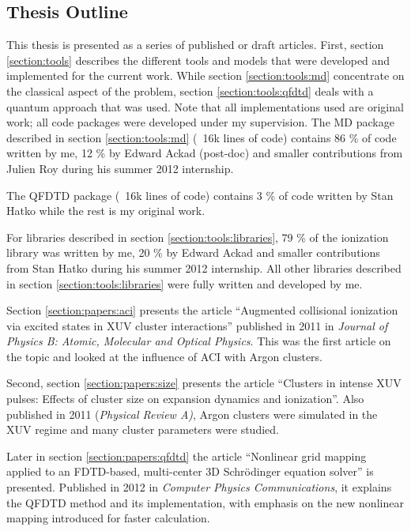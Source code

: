 \subsection{Thesis Outline}
\label{section:intro:outline}
This thesis is presented as a series of published or draft articles.
First, section \ref{section:tools} describes the different tools and models
that were developed and implemented for the current work. While section
\ref{section:tools:md} concentrate on the classical aspect of the problem,
section \ref{section:tools:qfdtd} deals with a quantum approach that was
used. Note that all implementations used are original work; all code packages
were developed under my supervision. The MD package described in section
\ref{section:tools:md} (~16k lines of code) contains 86 \% of code written by
me, 12 \% by Edward Ackad (post-doc) and smaller contributions from Julien Roy
during his summer 2012 internship.

The QFDTD package (~16k lines of code) contains 3 \% of code written by Stan
Hatko while the rest is my original work.

For libraries described in section \ref{section:tools:libraries}, 79 \% of the
ionization library was written by me, 20 \% by Edward Ackad and smaller
contributions from Stan Hatko during his summer 2012 internship. All other
libraries described in section \ref{section:tools:libraries} were fully
written and developed by me.


Section \ref{section:papers:aci} presents the article ``Augmented collisional
ionization via excited states in XUV cluster interactions'' published in 2011
in \textit{Journal of Physics B: Atomic, Molecular and Optical Physics}. This
was the first article on the topic and looked at the influence of ACI with Argon
clusters.

Second, section \ref{section:papers:size} presents the article ``Clusters in
intense XUV pulses: Effects of cluster size on expansion dynamics and
ionization''. Also published in 2011 (\textit{Physical Review A)}, Argon
clusters were simulated in the XUV regime and many cluster parameters were
studied.

Later in section \ref{section:papers:qfdtd} the article ``Nonlinear grid mapping
applied to an FDTD-based, multi-center 3D Schr\"odinger equation solver'' is
presented. Published in 2012 in \textit{Computer Physics Communications}, it
explains the QFDTD method and its implementation, with emphasis on the new
nonlinear mapping introduced for faster calculation.

